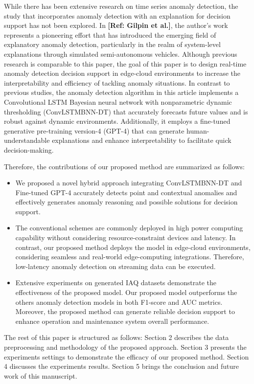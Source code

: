 \documentclass[final,3p,times,twocolumn]{elsarticle}
\begin{document}
While there has been extensive research on time series anomaly detection, the study that incorporates anomaly detection with an explanation for decision support has not been explored. In \textbf{[Ref: Gilpin et al.]}, the author’s work represents a pioneering effort that has introduced the emerging field of explanatory anomaly detection, particularly in the realm of system-level explanations through simulated semi-autonomous vehicles. Although previous research is comparable to this paper, the goal of this paper is to design real-time anomaly detection decision support in edge-cloud environments to increase the interpretability and efficiency of tackling anomaly situations. In contrast to previous studies, the anomaly detection algorithm in this article implements a Convolutional LSTM Bayesian neural network with nonparametric dynamic thresholding (ConvLSTMBNN-DT) that accurately forecasts future values and is robust against dynamic environments. Additionally, it employs a fine-tuned generative pre-training version-4 (GPT-4) that can generate human-understandable explanations and enhance interpretability to facilitate quick decision-making.

Therefore, the contributions of our proposed method are summarized as follows:
\begin{itemize}
\itemsep-0.25em 
\item We proposed a novel hybrid approach integrating ConvLSTMBNN-DT and Fine-tuned GPT-4 accurately detects point and contextual anomalies and effectively generates anomaly reasoning and possible solutions for decision support.
\item The conventional schemes are commonly deployed in high power computing capability without considering resource-constraint devices and latency. In contrast, our proposed method deploys the model in edge-cloud environments, considering seamless and real-world edge-computing integrations. Therefore, low-latency anomaly detection on streaming data can be executed.
\item Extensive experiments on generated IAQ datasets demonstrate the effectiveness of the proposed model. Our proposed model outperforms the others anomaly detection models in both F1-score and AUC metrics. Moreover, the proposed method can generate reliable decision support to enhance operation and maintenance system overall performance.
\end{itemize}

The rest of this paper is structured as follows: Section 2 describes the data preprocessing and methodology of the proposed approach. Section 3 presents the experiments settings to demonstrate the efficacy of our proposed method. Section 4 discusses the experiments results. Section 5 brings the conclusion and future work of this manuscript.
\end{document}
